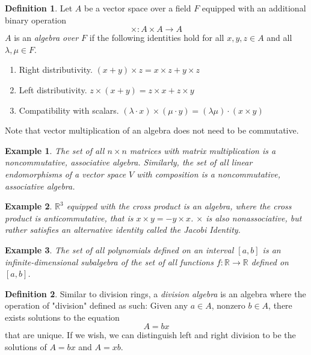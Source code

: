 \documentclass{article}
\newtheorem{example}{Example}[section]
\theoremstyle{remark}
\theoremstyle{definition}
\newtheorem{definition}{Definition}[section]
\begin{document}
\begin{definition}
Let $A$ be a vector space over a field $F$ equipped with an additional binary operation 
\[ \times: A \times A \longrightarrow A \]
$A$ is an \textit{algebra over $F$} if the following identities hold for all $x, y, z \in A$ and all $\lambda, \mu \in F$. 
\begin{enumerate}
    \item Right distributivity. $(x + y) \times z = x \times z + y \times z$ 
    \item Left distributivity. $z \times (x + y) = z \times x + z \times y$
    \item Compatibility with scalars. $(\lambda \cdot x ) \times (\mu \cdot y) = (\lambda \mu) \cdot (x \times y)$ 
\end{enumerate}
\end{definition}

Note that vector multiplication of an algebra does not need to be commutative. 

\begin{example}
The set of all $n \times n$ matrices with matrix multiplication is a noncommutative, associative algebra. Similarly, the set of all linear endomorphisms of a vector space $V$ with composition is a noncommutative, associative algebra. 
\end{example}

\begin{example}
$\mathbb{R}^3$ equipped with the cross product is an algebra, where the cross product is \textit{anticommutative}, that is $x \times y = - y \times x$. $\times$ is also nonassociative, but rather satisfies an alternative identity called the \textit{Jacobi Identity}. 
\end{example}

\begin{example}
The set of all polynomials defined on an interval $[a,b]$ is an infinite-dimensional subalgebra of the set of all functions $f: \mathbb{R} \longrightarrow \mathbb{R}$ defined on $[a,b]$.
\end{example}

\begin{definition}
Similar to division rings, a \textit{division algebra} is an algebra where the operation of "division" defined as such: Given any $a \in A$, nonzero $b \in A$, there exists solutions to the equation
\[A = bx\]
that are unique. If we wish, we can distinguish left and right division to be the solutions of $A = b x$ and $A = x b$. 
\end{definition}
\end{document}
